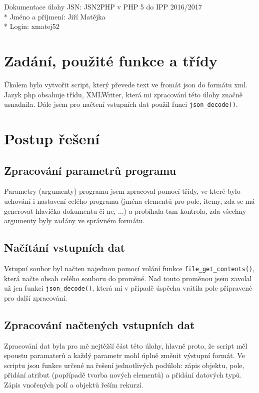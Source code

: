 \documentclass[a4paper, 10pt]{article}
\begin{document}
    \setlength{\parindent}{0cm}
    Dokumentace úlohy JSN: JSN2PHP v PHP 5 do IPP 2016/2017 \\*
    Jméno a příjmení: Jiří Matějka \\*
    Login: xmatej52
    \setlength{\parindent}{default}
    \section{Zadání, použité funkce a třídy}
        Úkolem bylo vytvořit script, který převede text ve fromát json do formátu
        xml. Jazyk php obsahuje třídu, XMLWriter, která mi zpracování této úlohy
        značně usnadnila. Dále jsem pro načtení vstupních dat použil funci
        \texttt{json\_decode()}.
    \section{Postup řešení}
        \subsection{Zpracování parametrů programu}
            Parametry (argumenty) programu jsem zpracoval pomocí třídy, ve které
            bylo uchování i nastavení celého programu (jména elementů pro pole,
            itemy, zda se má generovat hlavička dokumentu či ne, ...) a probíhala
            tam kontrola, zda všechny argumenty byly zadány ve správném formátu.
        \subsection{Načítání vstupních dat}
            Vstupní soubor byl načten najednou pomocí volání funkce \texttt{file\_get\_contents()},
            která načte obsah celého souboru do proměné. Nad touto proměnou jsem
            zavolal už jen funkci \texttt{json\_decode()}, která mi v případě úspěchu vrátila
            pole připravené pro další zpracování.
        \subsection{Zpracování načtených vstupních dat}
            Zpracování dat byla pro mě nejtěžší část této úlohy, hlavně proto, že
            script měl spoustu paramaterů a každý parametr mohl úplně změnit
            výstupní formát. Ve scriptu jsou funkce určené na řešení jednotlivých
            podúloh: zápis objektu, pole, přidání atribut (popřípadě tvorba nových
            elementů) a přidání datových typů. Zápis vnořených polí a objektů
            řeším rekurzí.
\end{document}
